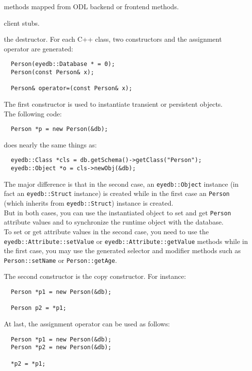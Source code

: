 \item methods mapped from ODL backend or frontend methods.
\item client stubs.
\item the destructor.
\ee
\ee
{}
For each C++ class, two constructors and the assignment operator are
generated:
\verbsize
\begin{verbatim}
  Person(eyedb::Database * = 0);
  Person(const Person& x);

  Person& operator=(const Person& x);
\end{verbatim}
\normalsize
\bi
\item The first constructor is used to instantiate transient or persistent objects.
\\
The following code:
\verbsize
\begin{verbatim}
  Person *p = new Person(&db);
\end{verbatim}
\normalsize
does nearly the same things as:
\verbsize
\begin{verbatim}
  eyedb::Class *cls = db.getSchema()->getClass("Person");
  eyedb::Object *o = cls->newObj(&db);
\end{verbatim}
\normalsize
The major difference is that in the second case, an \texttt{eyedb::Object} instance
(in fact an \texttt{eyedb::Struct} instance) is created while in the first case
an \texttt{Person} (which inherits from \texttt{eyedb::Struct}) instance is created.
\\
But in both cases, you can use the instantiated object to set and get
\texttt{Person} attribute values and to synchronize the runtime object with
the database.
\\
To set or get attribute values in the second case, you need to use
the \texttt{eyedb::Attribute::setValue} or \texttt{eyedb::Attribute::getValue} methods
while in the first case, you may use the generated selector and modifier
methods such as \texttt{Person::setName} or \texttt{Person::getAge}.
\item The second constructor is the copy constructor. For instance:
\verbsize
\begin{verbatim}
  Person *p1 = new Person(&db);

  Person p2 = *p1;
\end{verbatim}
\normalsize
\item At last, the assignment operator can be used as follows:
\verbsize
\begin{verbatim}
  Person *p1 = new Person(&db);
  Person *p2 = new Person(&db);

  *p2 = *p1;
\end{verbatim}
\normalsize
\ei

